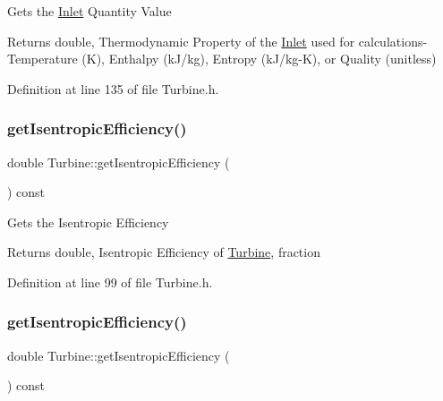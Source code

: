Gets the \hyperlink{class_inlet}{Inlet} Quantity Value

\begin{DoxyReturn}{Returns}
double, Thermodynamic Property of the \hyperlink{class_inlet}{Inlet} used for calculations-\/ Temperature (K), Enthalpy (k\+J/kg), Entropy (k\+J/kg-\/K), or Quality (unitless) 
\end{DoxyReturn}


Definition at line 135 of file Turbine.\+h.

\mbox{\label{class_turbine_a5d907859de4acc153a32bd443238b445}} 
\subsubsection{\texorpdfstring{get\+Isentropic\+Efficiency()}{getIsentropicEfficiency()}\hspace{0.1cm}{\footnotesize\ttfamily [1/3]}}
{\footnotesize\ttfamily double Turbine\+::get\+Isentropic\+Efficiency (\begin{DoxyParamCaption}{ }\end{DoxyParamCaption}) const\hspace{0.3cm}{\ttfamily [inline]}}

Gets the Isentropic Efficiency

\begin{DoxyReturn}{Returns}
double, Isentropic Efficiency of \hyperlink{class_turbine}{Turbine}, fraction 
\end{DoxyReturn}


Definition at line 99 of file Turbine.\+h.

\mbox{\label{class_turbine_a5d907859de4acc153a32bd443238b445}} 
\subsubsection{\texorpdfstring{get\+Isentropic\+Efficiency()}{getIsentropicEfficiency()}\hspace{0.1cm}{\footnotesize\ttfamily [2/3]}}
{\footnotesize\ttfamily double Turbine\+::get\+Isentropic\+Efficiency (\begin{DoxyParamCaption}{ }\end{DoxyParamCaption}) const\hspace{0.3cm}{\ttfamily [inline]}}

